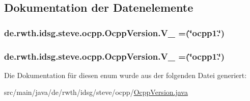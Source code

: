 \subsection{Dokumentation der Datenelemente}
\hypertarget{enumde_1_1rwth_1_1idsg_1_1steve_1_1ocpp_1_1_ocpp_version_a02a262b834136db4a30bb9a821c77574}{
\subsubsection[{V\-\_\-12}]{\setlength{\rightskip}{0pt plus 5cm}de.\-rwth.\-idsg.\-steve.\-ocpp.\-Ocpp\-Version.\-V\-\_ =(\char`\"{}ocpp1.\char`\"{})}}\label{enumde_1_1rwth_1_1idsg_1_1steve_1_1ocpp_1_1_ocpp_version_a02a262b834136db4a30bb9a821c77574}
\hypertarget{enumde_1_1rwth_1_1idsg_1_1steve_1_1ocpp_1_1_ocpp_version_a73e998996dec6fa643fc3241249866d4}{
\subsubsection[{V\-\_\-15}]{\setlength{\rightskip}{0pt plus 5cm}de.\-rwth.\-idsg.\-steve.\-ocpp.\-Ocpp\-Version.\-V\-\_ =(\char`\"{}ocpp1.\char`\"{})}}\label{enumde_1_1rwth_1_1idsg_1_1steve_1_1ocpp_1_1_ocpp_version_a73e998996dec6fa643fc3241249866d4}


Die Dokumentation für diesen enum wurde aus der folgenden Datei generiert\-:\begin{DoxyCompactItemize}
\item 
src/main/java/de/rwth/idsg/steve/ocpp/\hyperlink{_ocpp_version_8java}{Ocpp\-Version.\-java}\end{DoxyCompactItemize}
